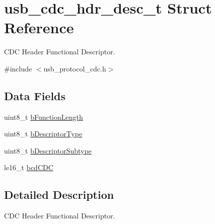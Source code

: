 \hypertarget{structusb__cdc__hdr__desc__t}{
\section{usb\-\_\-cdc\-\_\-hdr\-\_\-desc\-\_\-t \-Struct \-Reference}
\label{structusb__cdc__hdr__desc__t}
}


\-C\-D\-C \-Header \-Functional \-Descriptor.  




{\ttfamily \#include $<$usb\-\_\-protocol\-\_\-cdc.\-h$>$}

\subsection*{\-Data \-Fields}
\begin{DoxyCompactItemize}
\item 
uint8\-\_\-t \hyperlink{structusb__cdc__hdr__desc__t_a5cc7fd9ccd567771191345f2325f69f5}{b\-Function\-Length}
\item 
uint8\-\_\-t \hyperlink{structusb__cdc__hdr__desc__t_a2f64e8912373f4772be9cc268aff4336}{b\-Descriptor\-Type}
\item 
uint8\-\_\-t \hyperlink{structusb__cdc__hdr__desc__t_af15117c083f8811053fc398afc26b1bf}{b\-Descriptor\-Subtype}
\item 
le16\-\_\-t \hyperlink{structusb__cdc__hdr__desc__t_a6882eb0096f4d386031baab86bec8774}{bcd\-C\-D\-C}
\end{DoxyCompactItemize}


\subsection{\-Detailed \-Description}
\-C\-D\-C \-Header \-Functional \-Descriptor. 

